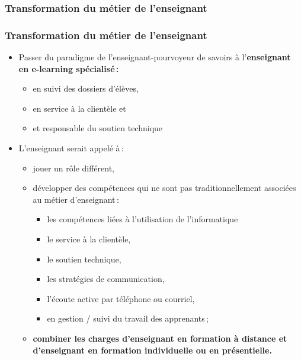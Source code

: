 					\subsubsection{Transformation du métier de l'enseignant} 
						\begin{frame}[allowframebreaks]
						\frametitle{Transformation du métier de l'enseignant}
                        			
                        			\begin{itemize}
                        			\item Passer du paradigme de l’enseignant-pourvoyeur de savoirs à l’\textbf{enseignant en e-learning spécialisé\,:}
                        				\begin{itemize}
                        				\item en suivi des dossiers d’élèves, 
                        				\item en service à la clientèle et 
                        				\item et responsable du soutien technique 
                        				\end{itemize}
                        			\framebreak
                        			\item L’enseignant serait appelé à\,:
                        				\begin{itemize}
                        				\item jouer un rôle différent, 
                        				\item développer des compétences qui ne sont pas traditionnellement associées au métier d’enseignant\,: 
                        					\begin{itemize}
                        					\item les compétences liées à l’utilisation de l’informatique
                        					\item le service à la clientèle, 
                        					\item le soutien technique, 
                        					\item les stratégies de communication, 
                        					\item l’écoute active par téléphone ou courriel, 
                        					\item en gestion / suivi du travail des apprenants\,;
                        					\end{itemize}
                        				\item \textbf {combiner les charges d’enseignant en formation à distance et d’enseignant en formation individuelle ou en présentielle.}
                        			\end{itemize}
						\end{itemize}
						\end{frame}		
					
